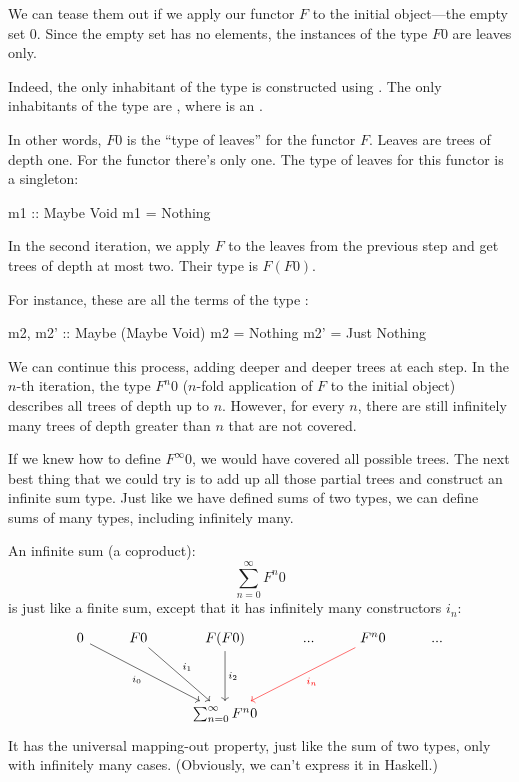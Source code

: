\documentclass[DaoFP]{subfiles}
\begin{document}
We can tease them out if we apply our functor $F$ to the initial object---the empty set $0$. Since the empty set has no elements, the instances of the type $F 0$ are leaves only. 

Indeed, the only inhabitant of the type  is constructed using . The only inhabitants of the type  are , where  is an .

In other words, $F 0$ is the ``type of leaves'' for the functor $F$. Leaves are trees of depth one. For the  functor there's only one. The type of leaves for this functor is a singleton:
\begin{haskell}
m1 :: Maybe Void
m1 = Nothing
\end{haskell}

In the second iteration, we apply $F$ to the leaves from the previous step and get trees of depth at most two. Their type is $F(F 0)$. 

For instance, these are all the terms of the type :
\begin{haskell}
m2, m2' :: Maybe (Maybe Void)
m2 = Nothing
m2' = Just Nothing
\end{haskell}

We can continue this process, adding deeper and deeper trees at each step. In the $n$-th iteration, the type $F^n 0$ ($n$-fold application of $F$ to the initial object) describes all trees of depth up to $n$. However, for every $n$, there are still infinitely many trees of depth greater than $n$ that are not covered. 

If we knew how to define $F^{\infty} 0$, we would have covered all possible trees. The next best thing that we could try is to add up all those partial trees and construct an infinite sum type. Just like we have defined sums of two types, we can define sums of many types, including infinitely many. 

An infinite sum (a coproduct):
$$ \sum_{n = 0}^{\infty} F^n 0$$
is just like a finite sum, except that it has infinitely many constructors $i_n$:
\[
 \begin{tikzcd}
 0
 \arrow[ddrr, "i_0"']
 & F 0
  \arrow[ddr, "i_1"]
& F (F 0)
  \arrow[dd, "i_2"]
 & ...
 & F^n 0
  \arrow[ddll, red, "i_n"]
 & ...
 \\
 \\
 &&\sum_{n = 0}^{\infty} F^n 0
  \end{tikzcd}
\]
It has the universal mapping-out property, just like the sum of two types, only with infinitely many cases. (Obviously, we can't express it in Haskell.)
\end{document}
